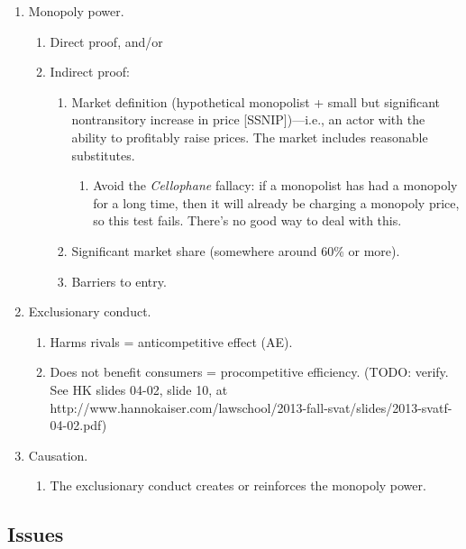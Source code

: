 \begin{enumerate}
    \item Monopoly power.
    \begin{enumerate}
        \item Direct proof, and/or
        \item Indirect proof:
        \begin{enumerate}
            \item Market definition (hypothetical monopolist + small but 
            significant nontransitory increase in price [SSNIP])---i.e., an 
            actor with the ability to profitably raise prices. The market 
            includes reasonable substitutes.
            \begin{enumerate}
                \item Avoid the \emph{Cellophane} fallacy: if a monopolist has 
                had a monopoly for a long time, then it will already be 
                charging a monopoly price, so this test fails. There's no good 
                way to deal with this.
            \end{enumerate}
            \item Significant market share (somewhere around 60\% or more).
            \item Barriers to entry.
        \end{enumerate}
    \end{enumerate}
    \item Exclusionary conduct.
    \begin{enumerate}
        \item Harms rivals = anticompetitive effect (AE).
        \item Does not benefit consumers = procompetitive efficiency. (TODO: 
        verify. See HK slides 04-02, slide 10, at 
        http://www.hannokaiser.com/lawschool/2013-fall-svat/slides/2013-svatf-04-02.pdf)
    \end{enumerate}
    \item Causation.
    \begin{enumerate}
        \item The exclusionary conduct creates or reinforces the monopoly 
        power.
    \end{enumerate}
\end{enumerate}

\subsection{Issues}

